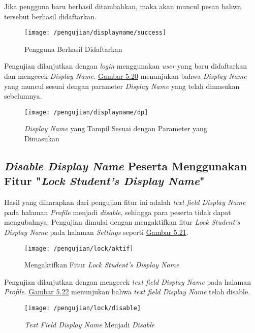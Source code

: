 	Jika pengguna baru berhasil ditambahkan, maka akan muncul pesan bahwa tersebut berhasil didaftarkan.
	\begin{figure}[H]
		\centering  
		\texttt{[image: /pengujian/displayname/success]}  
		\caption[Pengguna Berhasil Didaftarkan]{Pengguna Berhasil Didaftarkan} 
		\label{fig:success} 
	\end{figure}

	Pengujian dilanjutkan dengan \textit{login} menggunakan \textit{user} yang baru didaftarkan dan mengecek \textit{Display Name}. \hyperref[fig:dp]{Gambar 5.20} menunjukan bahwa \textit{Display Name} yang muncul sesuai dengan parameter \textit{Display Name} yang telah dimasukan sebelumnya.
	\begin{figure}[H]
		\centering  
		\texttt{[image: /pengujian/displayname/dp]}  
		\caption[\textit{Display Name} yang Tampil Sesuai dengan Parameter yang Dimasukan]{\textit{Display Name} yang Tampil Sesuai dengan Parameter yang Dimasukan} 
		\label{fig:dp} 
	\end{figure}

	\subsection{\textit{Disable Display Name} Peserta Menggunakan Fitur "\textit{Lock Student's Display Name}"}
	Hasil yang diharapkan dari pengujian fitur ini adalah \textit{text field Display Name} pada halaman \textit{Profile} menjadi \textit{disable}, sehingga para peserta tidak dapat mengubahnya. Pengujian dimulai dengan mengaktifkan fitur \textit{Lock Student's Display Name} pada halaman \textit{Settings} seperti \hyperref[fig:dp]{Gambar 5.21}.
	\begin{figure}[H]
		\centering  
		\texttt{[image: /pengujian/lock/aktif]}  
		\caption[Mengaktifkan Fitur \textit{Lock Student's Display Name}]{Mengaktifkan Fitur \textit{Lock Student's Display Name}} 
		\label{fig:aktif} 
	\end{figure}
	
	Pengujian dilanjutkan dengan mengecek \textit{text field Display Name} pada halaman \textit{Profile}. \hyperref[fig:dp]{Gambar 5.22} menunjukan bahwa \textit{text field Display Name} telah disable.
	\begin{figure}[H]
		\centering  
		\texttt{[image: /pengujian/lock/disable]}  
		\caption[\textit{Text Field Display Name} Menjadi \textit{Disable}]{\textit{Text Field Display Name} Menjadi \textit{Disable}} 
		\label{fig:disable} 
	\end{figure}

